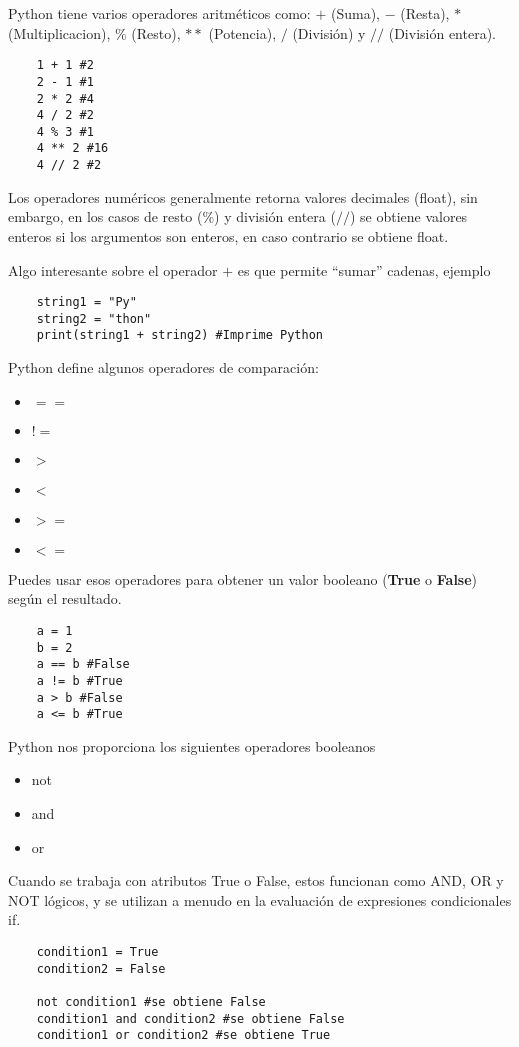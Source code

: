 \documentclass[12pt]{article}
\theoremstyle{definition}
\begin{document}
    Python tiene varios operadores aritméticos como: $+$ (Suma), $-$ (Resta), $*$ (Multiplicacion), $\%$ (Resto), $**$ (Potencia),
    $/$ (División) y $//$ (División entera).
    \begin{lstlisting}
    1 + 1 #2
    2 - 1 #1
    2 * 2 #4
    4 / 2 #2
    4 % 3 #1
    4 ** 2 #16
    4 // 2 #2
    \end{lstlisting}

    Los operadores numéricos generalmente retorna valores decimales (float), sin embargo, en los casos de resto ($\%$) y división entera ($//$)
    se obtiene valores enteros si los argumentos son enteros, en caso contrario se obtiene float.

    Algo interesante sobre el operador $+$ es que permite ``sumar'' cadenas, ejemplo
    \begin{lstlisting}
    string1 = "Py"
    string2 = "thon"
    print(string1 + string2) #Imprime Python
    \end{lstlisting}

    Python define algunos operadores de comparación:
    \begin{itemize}
        \item $==$
        \item $!=$
        \item $>$
        \item $<$
        \item $>=$
        \item $<=$
    \end{itemize}
    Puedes usar esos operadores para obtener un valor booleano (\textbf{True} o \textbf{False}) según el resultado.

    \begin{lstlisting}
    a = 1
    b = 2
    a == b #False
    a != b #True
    a > b #False
    a <= b #True
    \end{lstlisting}

    Python nos proporciona los siguientes operadores booleanos
    \begin{itemize}
        \item not
        \item and
        \item or
    \end{itemize}
    Cuando se trabaja con atributos True o False, estos funcionan como AND, OR y NOT lógicos, y se utilizan a menudo en
    la evaluación de expresiones condicionales if.

    \begin{lstlisting}
    condition1 = True
    condition2 = False

    not condition1 #se obtiene False
    condition1 and condition2 #se obtiene False
    condition1 or condition2 #se obtiene True
    \end{lstlisting}
\end{document}
